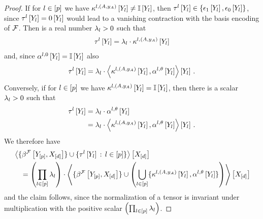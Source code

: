 \begin{proof}
    If for $l\in[p]$ we have $\kappa^{l,(A,y_{A})}\left[Y_{l}\right]\neq\mathbb{I}\left[Y_{l}\right]$, then $\tau^{l}\left[Y_{l}\right]\in\{\epsilon_{1}\left[Y_{l}\right],\epsilon_{0}\left[Y_{l}\right]\}$, since $\tau^{l}\left[Y_{l}\right]=0\left[Y_{l}\right]$ would lead to a vanishing contraction with the basis encoding of $\mathcal{F}$.
    Then is a real number $\lambda_{l}>0$ such that
    \begin{align*}
        \tau^{l}\left[Y_{l}\right]
        = \lambda_{l} \cdot \kappa^{l,(A,y_{A})}\left[Y_{l}\right]
    \end{align*}
    and, since $\alpha^{l,0}\left[Y_{l}\right] = \mathbb{I}\left[Y_{l}\right]$ also
    \begin{align*}
        \tau^{l}\left[Y_{l}\right]
        = \lambda_{l} \cdot \left\langle \kappa^{l,(A,y_{A})}\left[Y_{l}\right],\alpha^{l,\theta}\left[Y_{l}\right]\right\rangle \left[ Y_{l} \right] \, .
    \end{align*}
    Conversely, if for $l\in[p]$ we have $\kappa^{l,(A,y_{A})}\left[Y_{l}\right]=\mathbb{I}\left[Y_{l}\right]$, then there is a scalar $\lambda_{l}>0$ such that
    \begin{align*}
        \tau^{l}\left[Y_{l}\right]
        &= \lambda_{l} \cdot \alpha^{l,\theta}\left[Y_{l}\right] \\
        &= \lambda_{l} \cdot \left\langle \kappa^{l,(A,y_{A})}\left[Y_{l}\right],\alpha^{l,\theta}\left[Y_{l}\right]\right\rangle \left[ Y_{l} \right] \, .
    \end{align*}
    We therefore have
    \begin{align*}
        &\left\langle 
            \{\beta^{\mathcal{F}}\left[Y_{[p]},X_{[d]}\right]\}
            \cup \{\tau^{l}\left[Y_{l}\right]\,:\,l\in[p]\}
        \right\rangle \left[ X_{[d]} \right]\\
        &\quad =\left(\prod_{l\in[p]}\lambda_{l}\right)\cdot\left\langle 
            \{\beta^{\mathcal{F}}\left[Y_{[p]},X_{[d]}\right]\}
            \cup \left(\bigcup_{l\in[p]}\{\kappa^{l,(A,y_{A})}\left[Y_{l}\right],\alpha^{l,\theta}\left[Y_{l}\right]\}\right)
        \right\rangle \left[ X_{[d]} \right]
    \end{align*}
    and the claim follows, since the normalization of a tensor is invariant under multiplication with the positive scalar $\left(\prod_{l\in[p]}\lambda_{l}\right)$.
\end{proof}

